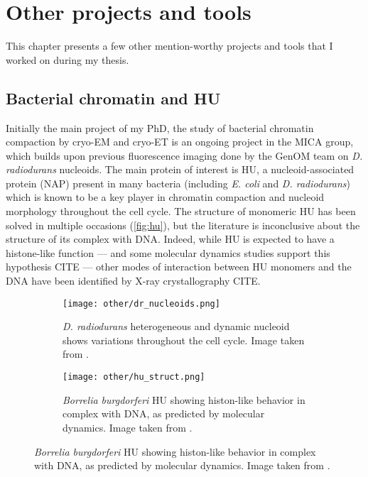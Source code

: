 \chapter{Other projects and tools}\label{other_projects}

This chapter presents a few other mention-worthy projects and tools that I worked on during my thesis.

\localtableofcontents

\section{Bacterial chromatin and HU}

Initially the main project of my PhD, the study of bacterial chromatin compaction by cryo-EM and cryo-ET is an ongoing project in the MICA group, which builds upon previous fluorescence imaging done by the GenOM team on \textit{D. radiodurans} nucleoids.
The main protein of interest is HU, a nucleoid-associated protein (NAP) present in many bacteria (including \textit{E. coli} and \textit{D. radiodurans}) which is known to be a key player in chromatin compaction and nucleoid morphology throughout the cell cycle.
The structure of monomeric HU has been solved in multiple occasions (\autoref{fig:hu}), but the literature is inconclusive about the structure of its complex with DNA.
Indeed, while HU is expected to have a histone-like function --- and some molecular dynamics studies support this hypothesis CITE --- other modes of interaction between HU monomers and the DNA have been identified by X-ray crystallography CITE.

\begin{figure}[ht]
    \centering
    \begin{subfigure}[B]{.48\textwidth}
        \centering
        \texttt{[image: other/dr\_nucleoids.png]}
        \caption{\textit{D. radiodurans} heterogeneous and dynamic nucleoid shows variations throughout the cell cycle. Image taken from \citet{flochCellMorphologyNucleoid2019}.}
        \label{fig:hu_nucleoids}
    \end{subfigure}%
    \hfill
    \begin{subfigure}[B]{.5\textwidth}
        \centering
        \texttt{[image: other/hu\_struct.png]}
        \caption{\textit{Borrelia burgdorferi} HU showing histon-like behavior in complex with DNA, as predicted by molecular dynamics. Image taken from \citet{hognonMolecularBasesDNA2019}.}
        \label{fig:hu_structure}
    \end{subfigure}%
    \label{fig:hu}
\end{figure}

